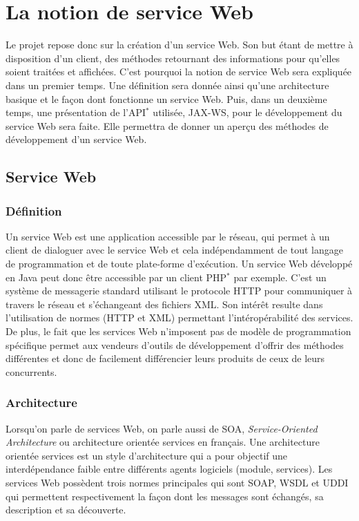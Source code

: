\chapter{La notion de service Web}
\label{section:serviceWeb}

Le projet repose donc sur la cr\'eation d'un service Web.
Son but \'etant de mettre \`a disposition d'un client, des m\'ethodes retournant des informations pour qu'elles soient trait\'ees et affich\'ees.
C'est pourquoi la notion de service Web sera expliqu\'ee dans un premier temps.
Une d\'efinition sera donn\'ee ainsi qu'une architecture basique et le fa\c{c}on dont fonctionne un service Web.
Puis, dans un deuxi\`eme temps, une pr\'esentation de l'API$^*$ utilis\'ee, JAX-WS, pour le d\'eveloppement du service Web sera faite.
Elle permettra de donner un aper\c{c}u des m\'ethodes de d\'eveloppement d'un service Web.

\section{Service Web}

\subsection{D\'efinition}

Un service Web est une application accessible par le r\'eseau, qui permet \`a un client de dialoguer avec le service Web et cela ind\'ependamment de tout langage de programmation et de toute plate-forme d'ex\'ecution.
Un service Web d\'evelopp\'e en Java peut donc \^etre accessible par un client PHP$^*$ par exemple.
C'est un syst\`eme de messagerie standard utilisant le protocole HTTP pour communiquer \`a travers le r\'eseau et s'\'echangeant des fichiers XML.
Son int\'er\^et resulte dans l'utilisation de normes (HTTP et XML) permettant l'int\'erop\'erabilit\'e des services.
De plus, le fait que les services Web n'imposent pas de mod\`ele de programmation sp\'ecifique permet aux vendeurs d'outils de d\'eveloppement d'offrir des m\'ethodes diff\'erentes et donc de facilement diff\'erencier leurs produits de ceux de leurs concurrents.

\subsection{Architecture}

Lorsqu'on parle de services Web, on parle aussi de SOA, \textit{Service-Oriented Architecture} ou architecture orient\'ee services en fran\c{c}ais.
Une architecture orient\'ee services est un style d'architecture qui a pour objectif une interd\'ependance faible entre diff\'erents agents logiciels (module, services).
Les services Web poss\`edent trois normes principales qui sont SOAP, WSDL et UDDI qui permettent respectivement la fa\c{c}on dont les messages sont \'echang\'es, sa description et sa d\'ecouverte.

